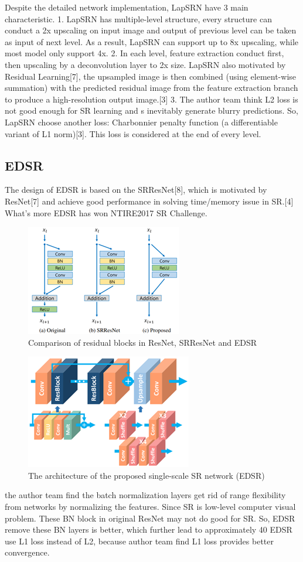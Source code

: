 \documentclass[10pt,twocolumn,letterpaper]{article}
\begin{document}
Despite the detailed network implementation, LapSRN have 3 main characteristic.
	1. LapSRN has multiple-level structure, every structure can conduct a 2x upscaling on input image and output of previous level can be taken as input of next level. As a result, LapSRN can support up to 8x upscaling, while most model only support 4x. 
2. In each level, feature extraction conduct first, then upscaling by a deconvolution layer to 2x size. LapSRN also motivated by Residual Learning[7], the upsampled image is then combined (using element-wise summation) with the predicted residual image from the feature extraction branch to produce a high-resolution output image.[3]
3. The author team think L2 loss is not good enough for SR learning and s inevitably
generate blurry predictions. So, LapSRN choose another loss: Charbonnier penalty function (a differentiable variant of L1 norm)[3]. This loss is considered at the end of every level.


\subsection{EDSR}
The design of EDSR is based on the SRResNet[8], which is motivated by ResNet[7] and achieve good performance in solving time/memory issue in SR.[4] What's more EDSR has won NTIRE2017 SR Challenge.
\begin{figure}[H]
    \centering
    \includegraphics[scale = 0.6]{images/EDSR1.png}
    \caption{Comparison of residual blocks in ResNet, SRResNet and EDSR}
\end{figure} 
\begin{figure}[H]
    \centering
    \includegraphics[scale = 0.6]{images/EDSR2.png}
    \caption{The architecture of the proposed single-scale SR network (EDSR)}
\end{figure} 
the author team find the batch normalization layers get rid of range flexibility from networks by normalizing the features. Since SR is low-level computer visual problem. These BN block in original ResNet may not do good for SR. So, EDSR remove these BN layers is better, which further lead to approximately 40%
	EDSR use L1 loss instead of L2, because author team find L1 loss provides better convergence.
\end{document}
